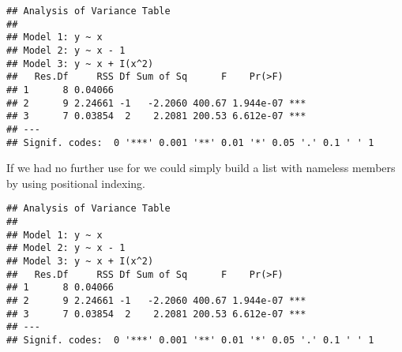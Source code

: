 \documentclass[krantz2]{krantz}\usepackage{knitr}%
\begin{document}
\begin{knitrout}\footnotesize
{}\color{fgcolor}\begin{kframe}
\begin{alltt}
 \hlkwb{<-} \hlstd{(} \hlstd{=} \hlopt{:}\hlstd{,}  \hlstd{=} \hlopt{:} \hlopt{+} \hlstd{(}\hlstd{,} \hlstd{,} \hlstd{))}
 \hlkwb{<-} \hlstd{()}
 \hlkwb{<-} \hlstd{(}  \hlopt{~}    \hlopt{~}  \hlopt{-} \hlstd{,}   \hlopt{~}  \hlopt{+} \hlopt{^}\hlstd{))}
   
    \hlkwb{<-}   
   \hlstd{\}}
 
\end{alltt}
\begin{verbatim}
## Analysis of Variance Table
## 
## Model 1: y ~ x
## Model 2: y ~ x - 1
## Model 3: y ~ x + I(x^2)
##   Res.Df     RSS Df Sum of Sq      F    Pr(>F)    
## 1      8 0.04066                                  
## 2      9 2.24661 -1   -2.2060 400.67 1.944e-07 ***
## 3      7 0.03854  2    2.2081 200.53 6.612e-07 ***
## ---
## Signif. codes:  0 '***' 0.001 '**' 0.01 '*' 0.05 '.' 0.1 ' ' 1
\end{verbatim}
\end{kframe}
\end{knitrout}

If we had no further use for  we could simply build a list with nameless members by using positional indexing.

\begin{knitrout}\footnotesize
{}\color{fgcolor}\begin{kframe}
\begin{alltt}
 \hlkwb{<-} \hlstd{()}
 \hlkwb{<-}  \hlopt{~}  \hlopt{~}  \hlopt{-}  \hlopt{~}  \hlopt{+} \hlopt{^}\hlstd{))}
   \hlstd{(} 
    \hlkwb{<-}   
   \hlstd{\}}
\end{alltt}
\begin{verbatim}
## Analysis of Variance Table
## 
## Model 1: y ~ x
## Model 2: y ~ x - 1
## Model 3: y ~ x + I(x^2)
##   Res.Df     RSS Df Sum of Sq      F    Pr(>F)    
## 1      8 0.04066                                  
## 2      9 2.24661 -1   -2.2060 400.67 1.944e-07 ***
## 3      7 0.03854  2    2.2081 200.53 6.612e-07 ***
## ---
## Signif. codes:  0 '***' 0.001 '**' 0.01 '*' 0.05 '.' 0.1 ' ' 1
\end{verbatim}
\end{kframe}
\end{knitrout}
\end{document}
